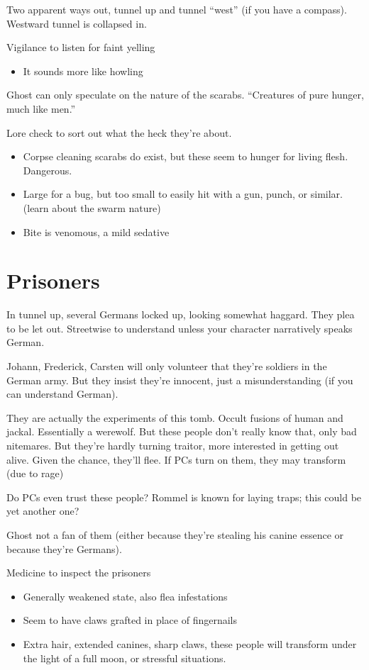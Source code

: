 \documentclass[background]{book}
\newcommand{\df}{\DifficultyDie}
\newcommand{\stb}{\SetbackDie}
\begin{document}
\begin{multicols}{2}
Two apparent ways out, tunnel up and tunnel ``west'' (if you have a compass).  Westward tunnel is collapsed in.

\df\df\df Vigilance to listen for faint yelling
\begin{itemize}
    \item \Advantage It sounds more like howling
\end{itemize}

Ghost can only speculate on the nature of the scarabs.  ``Creatures of pure hunger, much like men.''

\df\df\df Lore check to sort out what the heck they're about.
    \begin{itemize}
        \item \Success Corpse cleaning scarabs do exist, but these seem to hunger for living flesh.  Dangerous.
        \item \Advantage Large for a bug, but too small to easily hit with a gun, punch, or similar.  (learn about the swarm nature)
        \item \Advantage Bite is venomous, a mild sedative
    \end{itemize}

\section{Prisoners}

In tunnel up, several Germans locked up, looking somewhat haggard.  They plea to be let out.  \df\df Streetwise to understand unless your character narratively speaks German.

Johann, Frederick, Carsten will only volunteer that they're soldiers in the German army.  But they insist they're innocent, just a misunderstanding (if you can understand German).

They are actually the experiments of this tomb.  Occult fusions of human and jackal.  Essentially a werewolf.  But these people don't really know that, only bad nitemares.  But they're hardly turning traitor, more interested in getting out alive.  Given the chance, they'll flee.  If PCs turn on them, they may transform (due to rage)

Do PCs even trust these people?  Rommel is known for laying traps; this could be yet another one?

Ghost not a fan of them (either because they're stealing his canine essence or because they're Germans).

\df\df\stb\stb Medicine to inspect the prisoners
    \begin{itemize}
        \item \Success Generally weakened state, also flea infestations
        \item \Advantage\Advantage Seem to have claws grafted in place of fingernails
        \item \Triumph Extra hair, extended canines, sharp claws, these people will transform under the light of a full moon, or stressful situations.
    \end{itemize}



\end{multicols}
\end{document}
